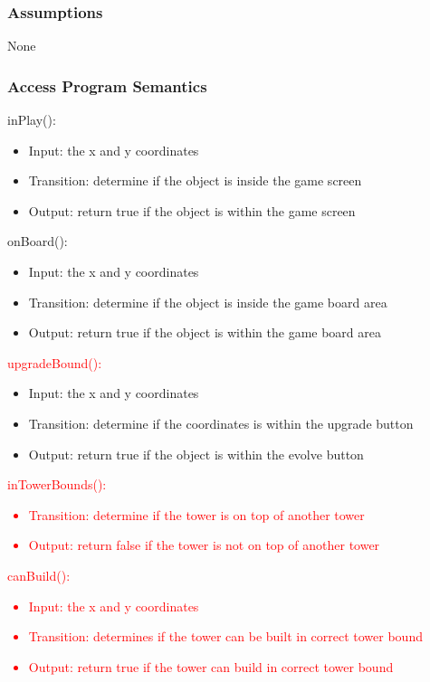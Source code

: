 \documentclass[12,english]{article}
\begin{document}
\subsubsection{Assumptions}
None
\subsubsection{Access Program Semantics}

\noindent inPlay():
\begin{itemize}
    \item Input: the x and y coordinates
    \item Transition: determine if the object is inside the game screen
    \item Output: return true if the object is within the game screen
\end{itemize}

\noindent onBoard():
\begin{itemize}
    \item Input: the x and y coordinates
    \item Transition: determine if the object is inside the game board area
    \item Output: return true if the object is within the game board area
\end{itemize}

\noindent \textcolor{red}{upgradeBound():}
\begin{itemize}
    \item Input: the x and y coordinates
    \item Transition: determine if the coordinates is within the upgrade button
    \item Output: return true if the object is within the evolve button
\end{itemize}

\noindent \textcolor{red}{inTowerBounds():}
\textcolor{red}{\begin{itemize}
    \item Transition: determine if the tower is on top of another tower
    \item Output: return false if the tower is not on top of another tower
\end{itemize}}

\noindent \textcolor{red}{canBuild():}
\textcolor{red}{\begin{itemize}
    \item Input: the x and y coordinates
    \item Transition: determines if the tower can be built in correct tower bound
    \item Output: return true if the tower can build in correct tower bound
\end{itemize}}
\end{document}
